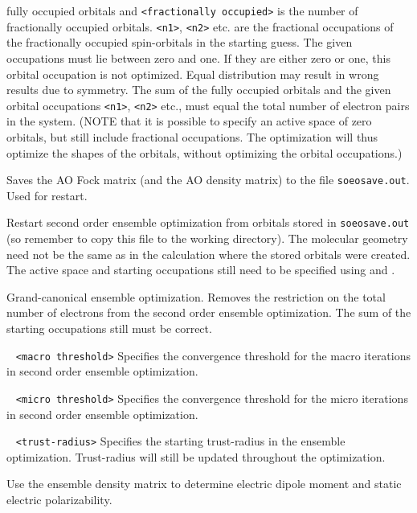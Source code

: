 \begin{description}
fully occupied orbitals and \verb|<fractionally occupied>| is the number of fractionally occupied orbitals. \verb|<n1>|, \verb|<n2>| etc. are the fractional 
occupations of the fractionally occupied spin-orbitals in the starting guess. The given occupations must lie between zero and one. If they are either zero 
or one, this orbital occupation is not optimized. Equal distribution may result in wrong results due to symmetry. The sum of the fully occupied orbitals and 
the given orbital occupations \verb|<n1>|, \verb|<n2>| etc., must equal the total number of electron pairs in the system. (NOTE that it is possible to 
specify an active space of zero orbitals, but still include fractional occupations. The optimization will thus optimize the shapes of the orbitals, without 
optimizing the orbital occupations.)
\item[\Key{SOEOSAVE}] 
Saves the AO Fock matrix (and the AO density matrix) to the file \verb|soeosave.out|. Used for restart.
\item[\Key{SOEORST}] 
Restart second order ensemble optimization from orbitals stored in \verb|soeosave.out| (so remember to copy this file to the working directory). 
The molecular geometry need not be the same as in the calculation 
where the stored orbitals were created. The active space and starting occupations still need to be specified using  and .
\item[\Key{SOEOGC}] 
Grand-canonical ensemble optimization. Removes the restriction on the total number of electrons from the second order ensemble optimization. The sum of the 
starting occupations still must be correct.
\item[\Key{SOEOMATHR}] \verb| | \newline
\verb|<macro threshold>|\newline 
Specifies the convergence threshold for the macro iterations in second order ensemble optimization.
\item[\Key{SOEOMITHR}] \verb| | \newline
\verb|<micro threshold>|\newline 
Specifies the convergence threshold for the micro iterations in second order ensemble optimization.
\item[\Key{SOEOTRUST}] \verb| | \newline
\verb|<trust-radius>|\newline 
Specifies the starting trust-radius in the ensemble optimization. Trust-radius will still be updated throughout the optimization.
\item[\Key{SOEODIPOLE}] Use the ensemble density matrix to determine electric dipole moment and static electric polarizability.

\end{description}

